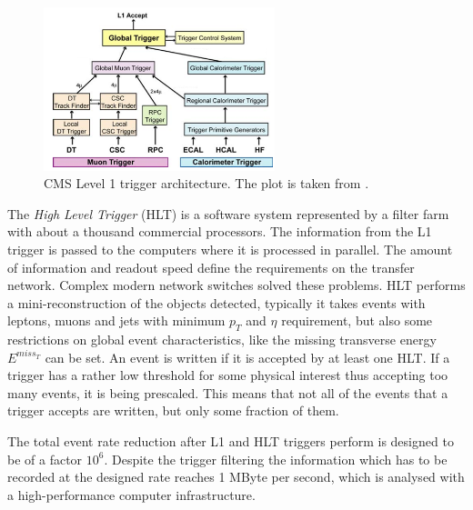 \begin{figure}[t]
  \centering
  \includegraphics[width=0.6\textwidth]{02_experimental_setup/plots/img_l1.png}
  \caption{CMS Level 1 trigger architecture. The plot is taken from \cite{CMSatLHC}.}
  \label{fig:trigA}
\end{figure}

The \textit{High Level Trigger} (HLT) is a software system represented by a filter farm with about a thousand commercial processors. The information
from the L1 trigger is passed to the computers where it is processed in parallel. The amount of information and readout speed define the requirements
on the transfer network. Complex modern network switches solved these problems. HLT performs a mini-reconstruction of the objects detected,
typically it takes events with leptons, muons and jets with minimum $p_{T}$ and $\eta$ requirement, but also some restrictions on global
event characteristics, like the missing transverse energy $E^{miss_{T}}$ can be set. An event is written if it is accepted by at least one HLT.
If a trigger has a rather low threshold for some physical interest thus accepting too many events, it is being prescaled. This means that not 
all of the events that a trigger accepts are written, but only some fraction of them.

The total event rate reduction after L1 and HLT triggers perform is designed to be of a factor $10^{6}$. Despite the trigger filtering
the information which has to be recorded at the designed rate reaches 1 MByte per second, which is analysed 
with a high-performance computer infrastructure\cite{CMScompTDR}.
% 
